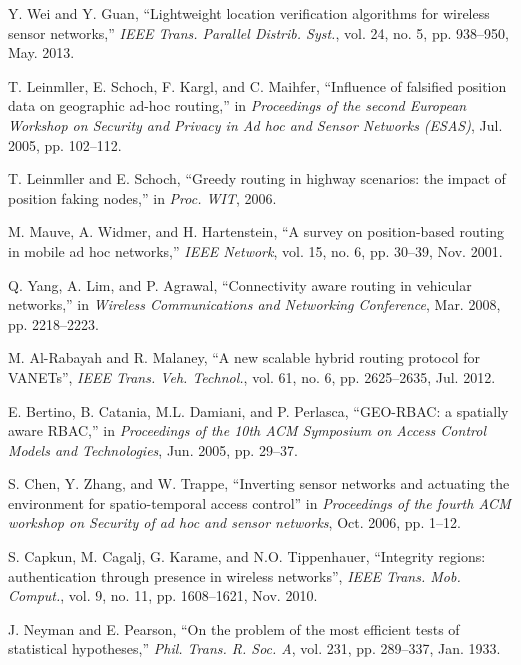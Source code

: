 \documentclass[journal]{IEEEtran}
\begin{document}
\begin{thebibliography}{1}
 Y. Wei and Y. Guan, ``Lightweight location verification algorithms for wireless sensor networks,'' \textit{IEEE Trans. Parallel Distrib. Syst.}, vol. 24, no. 5, pp. 938--950, May. 2013.





 T. Leinmller, E. Schoch, F. Kargl, and C. Maihfer, ``Influence of falsified position data on geographic ad-hoc routing,'' in \emph{Proceedings of the second European Workshop on Security and Privacy in Ad hoc and Sensor Networks (ESAS)}, Jul. 2005, pp. 102--112.

 T. Leinmller and E. Schoch, ``Greedy routing in highway scenarios: the impact of position faking nodes,'' in \emph{Proc. WIT}, 2006.

 M. Mauve, A. Widmer, and H. Hartenstein, ``A survey on position-based routing in mobile ad hoc networks,'' \emph{IEEE Network}, vol. 15, no. 6, pp. 30--39, Nov. 2001.

 Q. Yang, A. Lim, and P. Agrawal, ``Connectivity aware routing in vehicular
networks,'' in \emph{Wireless Communications and Networking Conference}, Mar. 2008, pp. 2218--2223.

 M. Al-Rabayah and R. Malaney, ``A new scalable hybrid routing protocol for VANETs'', \textit{IEEE Trans. Veh. Technol.}, vol. 61, no. 6, pp. 2625--2635, Jul. 2012.


 E. Bertino, B. Catania, M.L. Damiani, and P. Perlasca, ``GEO-RBAC: a spatially aware RBAC,'' in \emph{Proceedings of the 10th ACM Symposium on Access Control Models and Technologies}, Jun. 2005, pp. 29--37.

 S. Chen, Y. Zhang, and W. Trappe, ``Inverting sensor networks and actuating the environment for spatio-temporal access control'' in \emph{Proceedings of the fourth ACM workshop on Security of ad hoc and sensor networks}, Oct. 2006, pp. 1--12.


 S. Capkun, M. Cagalj, G. Karame, and N.O. Tippenhauer, ``Integrity regions: authentication through presence in wireless networks'',  \emph{IEEE Trans. Mob. Comput.}, vol. 9, no. 11, pp. 1608--1621, Nov. 2010.


 J. Neyman and E. Pearson, ``On the problem of the most efficient tests of statistical hypotheses,'' \textit{Phil. Trans. R. Soc. A}, vol. 231, pp. 289--337, Jan. 1933.


\end{thebibliography}
\end{document}
